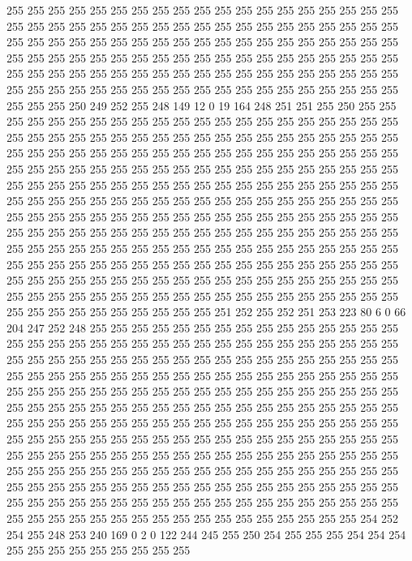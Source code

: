 255 255 255 255 255 255 255 255 255 255 255 255 255 255 255 255 255 255 255 255
255 255 255 255 255 255 255 255 255 255 255 255 255 255 255 255 255 255 255 255
255 255 255 255 255 255 255 255 255 255 255 255 255 255 255 255 255 255 255 255
255 255 255 255 255 255 255 255 255 255 255 255 255 255 255 255 255 255 255 255
255 255 255 255 255 255 255 255 255 255 255 255 255 255 255 255 255 255 255 255
255 255 255 255 255 255 255 255 255 255 255 255 255 255 255 255 255 250 249 252
255 248 149 12 0 19 164 248 251 251 255 250 255 255 255 255 255 255 255 255
255 255 255 255 255 255 255 255 255 255 255 255 255 255 255 255 255 255 255 255
255 255 255 255 255 255 255 255 255 255 255 255 255 255 255 255 255 255 255 255
255 255 255 255 255 255 255 255 255 255 255 255 255 255 255 255 255 255 255 255
255 255 255 255 255 255 255 255 255 255 255 255 255 255 255 255 255 255 255 255
255 255 255 255 255 255 255 255 255 255 255 255 255 255 255 255 255 255 255 255
255 255 255 255 255 255 255 255 255 255 255 255 255 255 255 255 255 255 255 255
255 255 255 255 255 255 255 255 255 255 255 255 255 255 255 255 255 255 255 255
255 255 255 255 255 255 255 255 255 255 255 255 255 255 255 255 255 255 255 255
255 255 255 255 255 255 255 255 255 255 255 255 255 255 255 255 255 255 255 255
255 255 255 255 255 255 255 255 255 255 255 255 255 255 255 255 255 255 255 255
255 255 255 255 255 255 255 255 255 255 255 255 255 255 255 255 255 255 255 255
255 255 255 255 255 255 255 255 255 255 255 255 251 252 255 252 251 253 223 80
6 0 66 204 247 252 248 255 255 255 255 255 255 255 255 255 255 255 255 255
255 255 255 255 255 255 255 255 255 255 255 255 255 255 255 255 255 255 255 255
255 255 255 255 255 255 255 255 255 255 255 255 255 255 255 255 255 255 255 255
255 255 255 255 255 255 255 255 255 255 255 255 255 255 255 255 255 255 255 255
255 255 255 255 255 255 255 255 255 255 255 255 255 255 255 255 255 255 255 255
255 255 255 255 255 255 255 255 255 255 255 255 255 255 255 255 255 255 255 255
255 255 255 255 255 255 255 255 255 255 255 255 255 255 255 255 255 255 255 255
255 255 255 255 255 255 255 255 255 255 255 255 255 255 255 255 255 255 255 255
255 255 255 255 255 255 255 255 255 255 255 255 255 255 255 255 255 255 255 255
255 255 255 255 255 255 255 255 255 255 255 255 255 255 255 255 255 255 255 255
255 255 255 255 255 255 255 255 255 255 255 255 255 255 255 255 255 255 255 255
255 255 255 255 255 255 255 255 255 255 255 255 255 255 255 255 255 255 255 255
255 255 255 255 255 255 255 255 254 252 254 255 248 253 240 169 0 2 0 122
244 245 255 250 254 255 255 255 254 254 254 255 255 255 255 255 255 255 255 255
